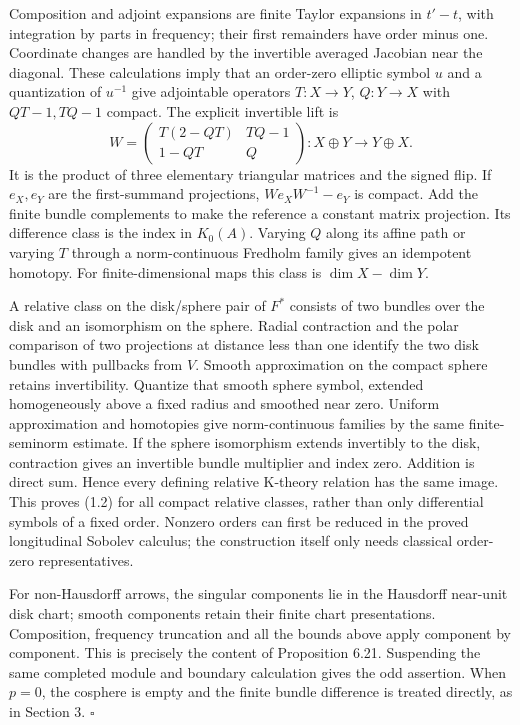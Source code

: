 \documentclass[
  11pt,
]{article}
\begin{document}
Composition and adjoint expansions are finite Taylor expansions in
\(t'-t\), with integration by parts in frequency; their first remainders
have order minus one. Coordinate changes are handled by the invertible
averaged Jacobian near the diagonal. These calculations imply that an
order-zero elliptic symbol \(u\) and a quantization of \(u^{-1}\) give
adjointable operators \(T:X\to Y\), \(Q:Y\to X\) with \(QT-1,TQ-1\)
compact. The explicit invertible lift is \[
 W=\begin{pmatrix}T(2-QT)&TQ-1\\1-QT&Q\end{pmatrix}:
 X\oplus Y\longrightarrow Y\oplus X.
\] It is the product of three elementary triangular matrices and the
signed flip. If \(e_X,e_Y\) are the first-summand projections,
\(We_XW^{-1}-e_Y\) is compact. Add the finite bundle complements to make
the reference a constant matrix projection. Its difference class is the
index in \(K_0(A)\). Varying \(Q\) along its affine path or varying
\(T\) through a norm-continuous Fredholm family gives an idempotent
homotopy. For finite-dimensional maps this class is \(\dim X-\dim Y\).

A relative class on the disk/sphere pair of \(F^*\) consists of two
bundles over the disk and an isomorphism on the sphere. Radial
contraction and the polar comparison of two projections at distance less
than one identify the two disk bundles with pullbacks from \(V\). Smooth
approximation on the compact sphere retains invertibility. Quantize that
smooth sphere symbol, extended homogeneously above a fixed radius and
smoothed near zero. Uniform approximation and homotopies give
norm-continuous families by the same finite-seminorm estimate. If the
sphere isomorphism extends invertibly to the disk, contraction gives an
invertible bundle multiplier and index zero. Addition is direct sum.
Hence every defining relative K-theory relation has the same image. This
proves (1.2) for all compact relative classes, rather than only
differential symbols of a fixed order. Nonzero orders can first be
reduced in the proved longitudinal Sobolev calculus; the construction
itself only needs classical order-zero representatives.

For non-Hausdorff arrows, the singular components lie in the Hausdorff
near-unit disk chart; smooth components retain their finite chart
presentations. Composition, frequency truncation and all the bounds
above apply component by component. This is precisely the content of
Proposition 6.21. Suspending the same completed module and boundary
calculation gives the odd assertion. When \(p=0\), the cosphere is empty
and the finite bundle difference is treated directly, as in Section 3.
\(\square\)
\end{document}
